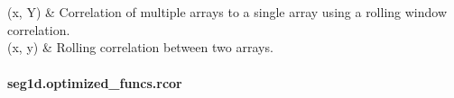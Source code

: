 \documentclass[letterpaper,10pt,english]{sphinxmanual}
\begin{document}
\begin{savenotes}\sphinxatlongtablestart\begin{longtable}[c]{}
\hline

\endfirsthead

%
{}\\
\hline

\endhead

\hline
{}\\
\endfoot

\endlastfoot

\sphinxAtStartPar
{\hyperref[\detokenize{generated/seg1d.optimized_funcs.rcor:seg1d.optimized_funcs.rcor}]{}}(x, Y)
&
\sphinxAtStartPar
Correlation of multiple arrays to a single array using a rolling window correlation.
\\
\hline
\sphinxAtStartPar
{\hyperref[\detokenize{generated/seg1d.optimized_funcs.vcor:seg1d.optimized_funcs.vcor}]{}}(x, y)
&
\sphinxAtStartPar
Rolling correlation between two arrays.
\\
\hline
\end{longtable}\sphinxatlongtableend\end{savenotes}


\paragraph{seg1d.optimized\_funcs.rcor}
\label{\detokenize{generated/seg1d.optimized_funcs.rcor:seg1d-optimized-funcs-rcor}}\label{\detokenize{generated/seg1d.optimized_funcs.rcor::doc}}
\end{document}
